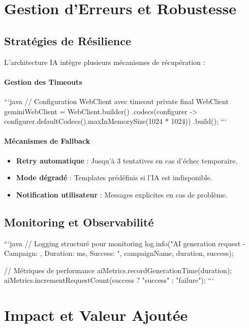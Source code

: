 \section{Gestion d'Erreurs et Robustesse}

\subsection{Stratégies de Résilience}

L'architecture IA intègre plusieurs mécanismes de récupération :

\paragraph{Gestion des Timeouts}
```java
// Configuration WebClient avec timeout
private final WebClient geminiWebClient = WebClient.builder()
    .codecs(configurer -> configurer.defaultCodecs().maxInMemorySize(1024 * 1024))
    .build();
```

\paragraph{Mécanismes de Fallback}
\begin{itemize}[label=\textbullet]
    \item \textbf{Retry automatique} : Jusqu'à 3 tentatives en cas d'échec temporaire.
    \item \textbf{Mode dégradé} : Templates prédéfinis si l'IA est indisponible.
    \item \textbf{Notification utilisateur} : Messages explicites en cas de problème.
\end{itemize}

\subsection{Monitoring et Observabilité}

```java
// Logging structuré pour monitoring
log.info("AI generation request - Campaign: {}, Duration: {}ms, Success: {}",
    campaignName, duration, success);

// Métriques de performance
aiMetrics.recordGenerationTime(duration);
aiMetrics.incrementRequestCount(success ? "success" : "failure");
```

\section{Impact et Valeur Ajoutée}

